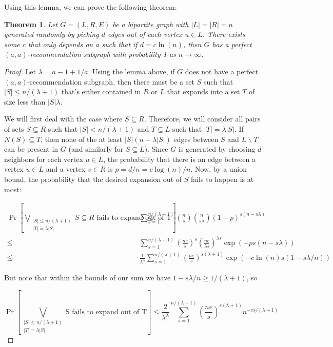 \documentclass[11pt]{article}
\newtheorem{thm}{Theorem}
\newcommand{\vs}{\vspace{0.2cm}}
\begin{document}
Using this lemma, we can prove the following theorem:

\begin{thm} 
Let $G=(L,R,E)$ be a bipartite graph with $|L|=|R|=n$ generated randomly by picking $d$ edges out of each vertex $u\in L$. There exists some $c$ that only depends on $a$ such that if $d=c\ln(n)$, then $G$ has a perfect $(a,a)$-recommendation subgraph with probability 1 as $n\to\infty$.
\end{thm}

\begin{proof}
Let $\lambda = a - 1 + 1/a$. Using the lemma above, if $G$ does not have a perfect $(a,a)$-recommendation subgraph, then there must be a set $S$ such that $|S|\leq n/(\lambda+1)$ that's either contained in $R$ or $L$ that expands into a set $T$ of size less than $|S|\lambda$. \vs

We will first deal with the case where $S\subseteq R$. Therefore, we will consider all pairs of sets $S\subseteq R$ such that $|S|<n/(\lambda+1)$ and $T\subseteq L$ such that $|T| = \lambda|S|$. If $N(S)\subseteq T$, then none of the at least $|S|(n-\lambda |S|)$ edges between $S$ and $L\backslash T$ can be present in $G$ (and similarly for $S\subseteq L$). Since $G$ is generated by choosing $d$ neighbors for each vertex $u\in L$, the probability that there is an edge between a vertex $u\in L$ and a vertex $v\in R$ is $p = d/n = c\log(n)/n$. Now, by a union bound, the probability that the desired expansion out of $S$ fails to happen is at most: 

\begin{align*}
       \Pr\left[\bigvee_{\substack{|S|\leq n/(\lambda+1) \\ |T| = \lambda |S|}} \text{$S\subseteq R$ fails to expand out of T}\right]
\leq&  \sum_{s=1}^{n/(\lambda+1)} \binom{n}{s}\binom{n}{s\lambda}(1-p)^{s(n-s\lambda)} \\
\leq&  \sum_{s=1}^{n/(\lambda+1)} \left(\frac{ne}{s}\right)^s \left(\frac{ne}{\lambda s}\right)^{\lambda s} \exp\left(-ps(n-s\lambda)\right) \\
\leq&  \frac{1}{\lambda^\lambda} \sum_{s=1}^{n/(\lambda+1)} \left(\frac{ne}{s}\right)^{s(\lambda+1)} \exp\left(-c\ln(n)s(1-s\lambda/n)\right)
\end{align*}

But note that within the bounds of our sum we have $1-s\lambda/n \geq 1/(\lambda+1)$, so

\[
\Pr\left[\bigvee_{\substack{|S|\leq n/(\lambda+1) \\ |T| = \lambda |S|}} \text{S fails to expand out of T}\right]
\leq \frac{2}{\lambda^\lambda} \sum_{s=1}^{n/(\lambda+1)} \left(\frac{ne}{s}\right)^{s(\lambda+1)} n^{-cs/(\lambda+1)}
\]


\end{proof}
\end{document}
